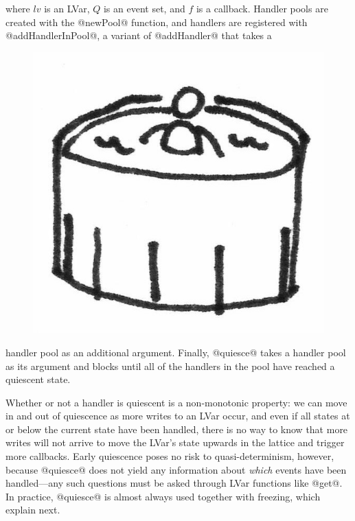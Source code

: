 \noindent where $\mathit{lv}$ is an LVar, $Q$ is an event set, and $f$ is a
callback.  Handler pools are created with the @newPool@ function, and
handlers are registered with @addHandlerInPool@, a variant of
@addHandler@ that takes a
\ifdefined\DISSERTATION
\begin{figure}
\vspace{-1.5em}
\begin{center}
  \includegraphics[scale=0.15]{../illustrations/pool}
\end{center}
\vspace{-2em}
\end{figure}
\fi
handler pool as an additional argument.
Finally, @quiesce@ takes a handler pool as its argument and blocks
until all of the handlers in the pool have reached a quiescent state.

Whether or not a handler is quiescent is a non-monotonic
property: we can move in and out of quiescence as more writes to an
LVar occur, and even if all states at or below the current state have
been handled, there is no way to know that more writes will not arrive
to move the LVar's state upwards in the lattice and trigger more
callbacks.  Early quiescence poses no risk to quasi-determinism, however,
because @quiesce@ does not yield any information about \emph{which}
events have been handled---any such questions must be asked through
LVar functions like @get@.  In practice, @quiesce@ is almost always
used together with freezing, which  explain next.

